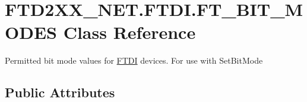 \hypertarget{class_f_t_d2_x_x___n_e_t_1_1_f_t_d_i_1_1_f_t___b_i_t___m_o_d_e_s}{}\section{F\+T\+D2\+X\+X\+\_\+\+N\+E\+T.\+F\+T\+D\+I.\+F\+T\+\_\+\+B\+I\+T\+\_\+\+M\+O\+D\+ES Class Reference}
\label{class_f_t_d2_x_x___n_e_t_1_1_f_t_d_i_1_1_f_t___b_i_t___m_o_d_e_s}


Permitted bit mode values for \mbox{\hyperlink{class_f_t_d2_x_x___n_e_t_1_1_f_t_d_i}{F\+T\+DI}} devices. For use with Set\+Bit\+Mode  


\subsection*{Public Attributes}
